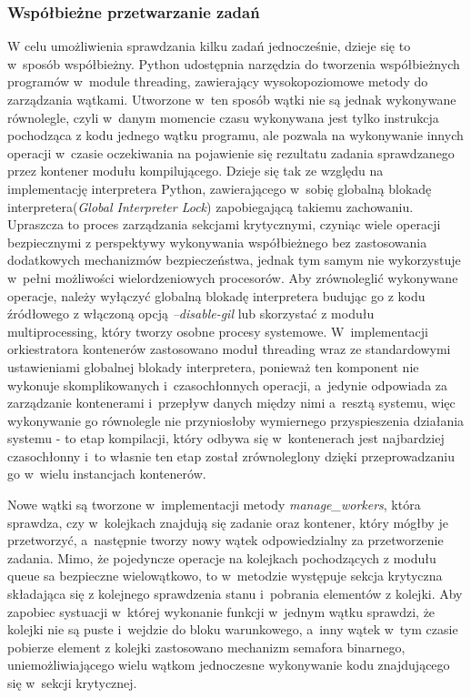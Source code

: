 \subsubsection{Współbieżne przetwarzanie zadań}
W celu umożliwienia sprawdzania kilku zadań jednocześnie, dzieje się to w~sposób współbieżny. Python udostępnia narzędzia do tworzenia współbieżnych programów w~module threading\cite{pythonThreading}, zawierający wysokopoziomowe metody do zarządzania wątkami. Utworzone w~ten sposób wątki nie są jednak wykonywane równolegle, czyli w~danym momencie czasu wykonywana jest tylko instrukcja pochodząca z kodu jednego wątku programu, ale pozwala na wykonywanie innych operacji w~czasie oczekiwania na pojawienie się rezultatu zadania sprawdzanego przez kontener modułu kompilującego. Dzieje się tak ze względu na implementację interpretera Python, zawierającego w~sobię globalną blokadę interpretera(\textit{Global Interpreter Lock}\cite{pythonGlobalInterpreterLock}) zapobiegającą takiemu zachowaniu. Upraszcza to proces zarządzania sekcjami krytycznymi, czyniąc wiele operacji bezpiecznymi z perspektywy wykonywania współbieżnego bez zastosowania dodatkowych mechanizmów bezpieczeństwa, jednak tym samym nie wykorzystuje w~pełni możliwości wielordzeniowych procesorów. Aby zrównoleglić wykonywane operacje, należy wyłączyć globalną blokadę interpretera budując go z kodu źródłowego z włączoną opcją \textit{--disable-gil} lub skorzystać z modułu multiprocessing\cite{pythonMultiprocessing}, który tworzy osobne procesy systemowe. W~implementacji orkiestratora kontenerów zastosowano moduł threading wraz ze standardowymi ustawieniami globalnej blokady interpretera, ponieważ ten komponent nie wykonuje skomplikowanych i~czasochłonnych operacji, a~jedynie odpowiada za zarządzanie kontenerami i~przepływ danych między nimi a~resztą systemu, więc wykonywanie go równolegle nie przyniosłoby wymiernego przyspieszenia działania systemu - to etap kompilacji, który odbywa się w~kontenerach jest najbardziej czasochłonny i~to własnie ten etap został zrównoleglony dzięki przeprowadzaniu go w~wielu instancjach kontenerów.

Nowe wątki są tworzone w~implementacji metody \textit{manage\_workers}, która sprawdza, czy w~kolejkach znajdują się zadanie oraz kontener, który mógłby je przetworzyć, a~następnie tworzy nowy wątek odpowiedzialny za przetworzenie zadania. Mimo, że pojedyncze operacje na kolejkach pochodzących z modułu queue\cite{pythonQueue} sa bezpieczne wielowątkowo, to w~metodzie występuje sekcja krytyczna składająca się z kolejnego sprawdzenia stanu i~pobrania elementów z kolejki. Aby zapobiec systuacji w~której wykonanie funkcji w~jednym wątku sprawdzi, że kolejki nie są puste i~wejdzie do bloku warunkowego, a~inny wątek w~tym czasie pobierze element z kolejki zastosowano mechanizm semafora binarnego, uniemożliwiającego wielu wątkom jednoczesne wykonywanie kodu znajdującego się w~sekcji krytycznej. 

